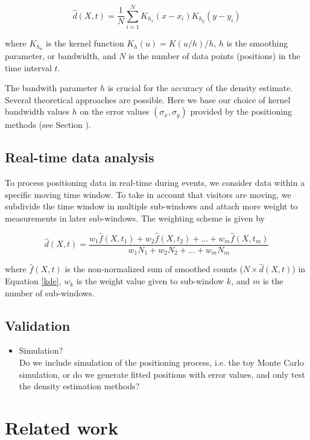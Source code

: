 \documentclass[10pt,a4paper]{article}
\begin{document}
\begin{equation}
\hat{d}(X,t)=\frac{1}{N }\sum_{i=1}^{N} K_{h_{x}} (x-x_{i}) K_{h_{y}} (y-y_{i})
\label{kde}
\end{equation}

where $K_{h_{u}}$ is the kernel function $K_{h}(u)=K(u/h)/h$, $h$ is the smoothing parameter, or bandwidth, and $N$ is the number of data points (positions) in the time interval $t$.

The bandwith parameter $h$ is crucial for the accuracy of the density estimate. 
Several theoretical approaches are possible.
Here we base our choice of kernel bandwidth values $h$ on the error values $(\sigma_{x},\sigma_{y})$ provided by the positioning methods (see Section ).

\subsection{Real-time data analysis}

To process positioning data in real-time during events, we consider data within a specific moving time window.
To take in account that visitors are moving, we subdivide the time window in multiple sub-windows and attach more weight to measurements in later sub-windows. The weighting scheme is given by

\begin{equation}
\hat{d}(X,t)=\frac{w_{1}\hat{f}(X,t_{1})+w_{2}\hat{f}(X,t_{2})+...+w_{m}\hat{f}(X,t_{m})}{w_{1}N_{1}+w_{2}N_{2}+...+w_{m}N_{m}}
\end{equation}

\noindent where $\hat{f}(X,t)$ is the non-normalized sum of smoothed counts ($N\times\hat{d}(X,t)$) in Equation \ref{kde}, $w_{k}$ is the weight value given to sub-window $k$, and $m$ is the number of sub-windows.

\subsection{Validation}

\begin{itemize}
\item Simulation?\\
Do we include simulation of the positioning process, i.e. the toy Monte Carlo simulation, or do we generate fitted positions with error values, and only test the density estimation methods?
\end{itemize}

\section{Related work}
\end{document}
